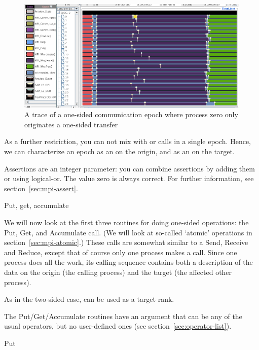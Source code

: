 \begin{figure}[ht]
  \includegraphics[scale=.4]{graphics/lonestar-twonode-put}%
  \caption{A trace of a one-sided communication epoch where process zero only originates
  a one-sided transfer}
  \label{fig:putblock}
\end{figure}

As a further restriction, you can not mix  with 
or  calls in a single epoch. Hence, we can
characterize an epoch as an  on the
origin, and as an  on the target.

Assertions are an integer parameter: you can combine assertions by
adding them or using logical-or.
The value zero is always correct. For further information, see
section~\ref{sec:mpi-assert}.


 {Put, get, accumulate}
\label{sec:putget}

We will now look at the first three routines for doing one-sided
operations: the Put, Get, and Accumulate call. (We will look at
so-called `atomic' operations in section~\ref{sec:mpi-atomic}.)
These calls are somewhat
similar to a Send, Receive and Reduce, except that of course only one
process makes a call.
Since one process does all the work, its calling sequence contains
both a description of the data on the origin (the calling process) and
the target (the affected other process).

As in the two-sided case,  can be used as
a target rank.

The Put/Get/Accumulate routines have an 
argument that can be any of the usual operators, but no
user-defined ones (see section~\ref{sec:operator-list}).

 {Put}
\label{sec:mpi-put}

